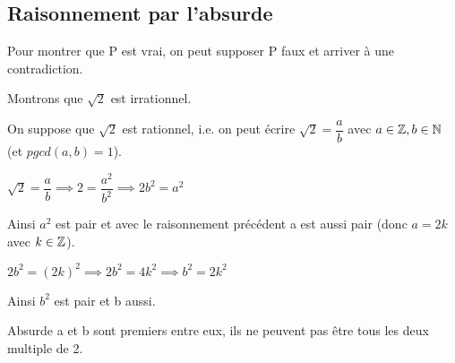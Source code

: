 \documentclass[a4paper, 12pt]{article}
\begin{document}
\subsection{Raisonnement par l'absurde}

Pour montrer que P est vrai, on peut supposer P faux et arriver à une contradiction.

\begin{example}
    Montrons que $\sqrt{2}$ est irrationnel.

    \begin{demonstration}
        On suppose que $\sqrt{2}$ est rationnel, i.e. on peut écrire $\sqrt{2} = \dfrac{a}{b}$ avec $a \in \mathbb{Z}, b \in \mathbb{N}$ (et $pgcd(a, b) = 1$).

        $\sqrt{2} = \dfrac{a}{b} \implies 2 = \dfrac{a^2}{b^2} \implies 2b^2 = a^2$

        Ainsi $a^2$ est pair et avec le raisonnement précédent a est aussi pair (donc $a = 2k$ avec $k \in \mathbb{Z}$).

        $2b^2 = (2k)^2 \implies 2b^2 = 4k^2 \implies b^2 = 2k^2$

        Ainsi $b^2$ est pair et b aussi.

        \begin{rdem}
            Absurde a et b sont premiers entre eux, ils ne peuvent pas être tous les deux multiple de 2.
        \end{rdem}
    \end{demonstration}
\end{example}
\end{document}
